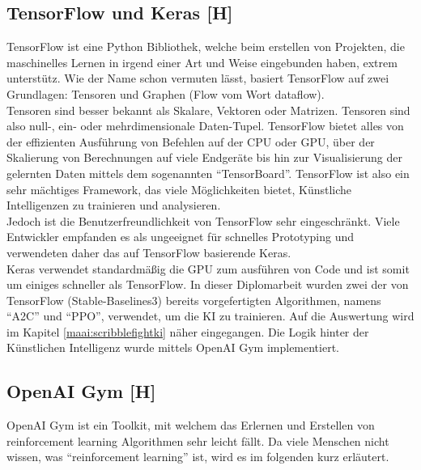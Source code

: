 \subsection{TensorFlow und Keras [H]}
TensorFlow ist eine Python Bibliothek, welche beim erstellen von Projekten, die maschinelles Lernen
in irgend einer Art und Weise eingebunden haben, extrem unterstütz.
Wie der Name schon vermuten lässt, basiert TensorFlow auf zwei Grundlagen: Tensoren und Graphen (Flow
vom Wort dataflow). \\
Tensoren sind besser bekannt als Skalare, Vektoren oder Matrizen. Tensoren sind also
null-, ein- oder mehrdimensionale Daten-Tupel.
TensorFlow bietet alles von der effizienten Ausführung von
Befehlen auf der CPU oder GPU, über der Skalierung von Berechnungen auf viele Endgeräte bis hin
zur Visualisierung der gelernten Daten mittels dem sogenannten ``TensorBoard''. TensorFlow ist also ein
sehr mächtiges Framework, das viele Möglichkeiten bietet, Künstliche Intelligenzen zu trainieren und
analysieren.\\
Jedoch ist die Benutzerfreundlichkeit von TensorFlow sehr eingeschränkt. Viele Entwickler empfanden
es als ungeeignet für schnelles Prototyping und verwendeten daher das auf TensorFlow basierende Keras. \\
Keras verwendet standardmäßig die GPU zum ausführen von Code und ist somit um einiges schneller als TensorFlow.
In dieser Diplomarbeit wurden zwei der von TensorFlow (Stable-Baselines3) bereits vorgefertigten Algorithmen,
namens ``A2C'' und ``PPO'', verwendet, um die KI zu trainieren. Auf die Auswertung wird im Kapitel \ref{maai:scribblefightki} näher
eingegangen. Die Logik hinter der Künstlichen Intelligenz
wurde mittels OpenAI Gym implementiert.

\subsection{OpenAI Gym [H]}
OpenAI Gym ist ein Toolkit, mit welchem das Erlernen und Erstellen von reinforcement learning Algorithmen
sehr leicht fällt. Da viele Menschen nicht wissen, was ``reinforcement learning'' ist, wird es im folgenden
kurz erläutert.

